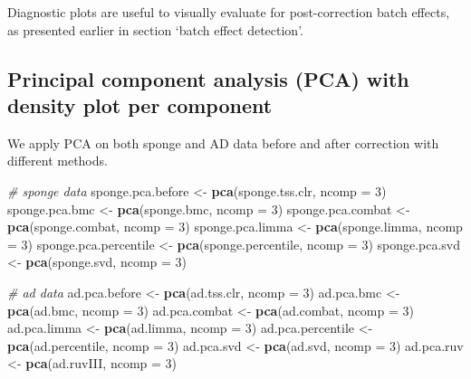 \documentclass[]{book}
\newenvironment{Shaded}{\begin{snugshade}}{\end{snugshade}}
\newcommand{\KeywordTok}[1]{\textcolor[rgb]{0.13,0.29,0.53}{\textbf{#1}}}
\newcommand{\DataTypeTok}[1]{\textcolor[rgb]{0.13,0.29,0.53}{#1}}
\newcommand{\DecValTok}[1]{\textcolor[rgb]{0.00,0.00,0.81}{#1}}
\newcommand{\StringTok}[1]{\textcolor[rgb]{0.31,0.60,0.02}{#1}}
\newcommand{\CommentTok}[1]{\textcolor[rgb]{0.56,0.35,0.01}{\textit{#1}}}
\newcommand{\NormalTok}[1]{#1}
\begin{document}
Diagnostic plots are useful to visually evaluate for post-correction
batch effects, as presented earlier in section `batch effect detection'.

\subsection{Principal component analysis (PCA) with density plot per
component}\label{principal-component-analysis-pca-with-density-plot-per-component-1}

We apply PCA on both sponge and AD data before and after correction with
different methods.

\begin{Shaded}
\begin{Highlighting}[]
\CommentTok{# sponge data}
\NormalTok{sponge.pca.before <-}\StringTok{ }\KeywordTok{pca}\NormalTok{(sponge.tss.clr, }\DataTypeTok{ncomp =} \DecValTok{3}\NormalTok{)}
\NormalTok{sponge.pca.bmc <-}\StringTok{ }\KeywordTok{pca}\NormalTok{(sponge.bmc, }\DataTypeTok{ncomp =} \DecValTok{3}\NormalTok{)}
\NormalTok{sponge.pca.combat <-}\StringTok{ }\KeywordTok{pca}\NormalTok{(sponge.combat, }\DataTypeTok{ncomp =} \DecValTok{3}\NormalTok{)}
\NormalTok{sponge.pca.limma <-}\StringTok{ }\KeywordTok{pca}\NormalTok{(sponge.limma, }\DataTypeTok{ncomp =} \DecValTok{3}\NormalTok{)}
\NormalTok{sponge.pca.percentile <-}\StringTok{ }\KeywordTok{pca}\NormalTok{(sponge.percentile, }\DataTypeTok{ncomp =} \DecValTok{3}\NormalTok{)}
\NormalTok{sponge.pca.svd <-}\StringTok{ }\KeywordTok{pca}\NormalTok{(sponge.svd, }\DataTypeTok{ncomp =} \DecValTok{3}\NormalTok{)}

\CommentTok{# ad data}
\NormalTok{ad.pca.before <-}\StringTok{ }\KeywordTok{pca}\NormalTok{(ad.tss.clr, }\DataTypeTok{ncomp =} \DecValTok{3}\NormalTok{)}
\NormalTok{ad.pca.bmc <-}\StringTok{ }\KeywordTok{pca}\NormalTok{(ad.bmc, }\DataTypeTok{ncomp =} \DecValTok{3}\NormalTok{)}
\NormalTok{ad.pca.combat <-}\StringTok{ }\KeywordTok{pca}\NormalTok{(ad.combat, }\DataTypeTok{ncomp =} \DecValTok{3}\NormalTok{)}
\NormalTok{ad.pca.limma <-}\StringTok{ }\KeywordTok{pca}\NormalTok{(ad.limma, }\DataTypeTok{ncomp =} \DecValTok{3}\NormalTok{)}
\NormalTok{ad.pca.percentile <-}\StringTok{ }\KeywordTok{pca}\NormalTok{(ad.percentile, }\DataTypeTok{ncomp =} \DecValTok{3}\NormalTok{)}
\NormalTok{ad.pca.svd <-}\StringTok{ }\KeywordTok{pca}\NormalTok{(ad.svd, }\DataTypeTok{ncomp =} \DecValTok{3}\NormalTok{)}
\NormalTok{ad.pca.ruv <-}\StringTok{ }\KeywordTok{pca}\NormalTok{(ad.ruvIII, }\DataTypeTok{ncomp =} \DecValTok{3}\NormalTok{)}
\end{Highlighting}
\end{Shaded}
\end{document}
